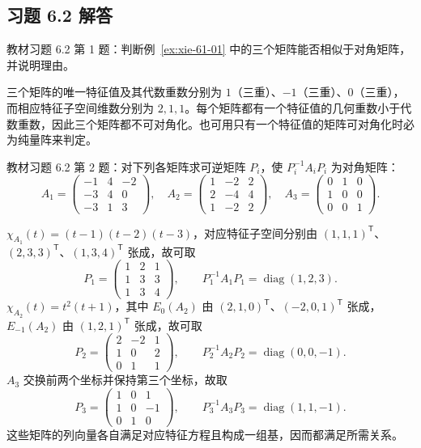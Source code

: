 \subsection{习题 6.2 解答}
\label{subsec:xie-exercises-62}

\begin{example}
\label{ex:xie-62-01}
教材习题 6.2 第 1 题：判断例~\ref{ex:xie-61-01} 中的三个矩阵能否相似于对角矩阵，并说明理由。
\end{example}
\begin{solve}
三个矩阵的唯一特征值及其代数重数分别为 $1$（三重）、$-1$（三重）、$0$（三重），而相应特征子空间维数分别为 $2,1,1$。每个矩阵都有一个特征值的几何重数小于代数重数，因此三个矩阵都不可对角化。也可用只有一个特征值的矩阵可对角化时必为纯量阵来判定。
\end{solve}

\begin{example}
\label{ex:xie-62-02}
教材习题 6.2 第 2 题：对下列各矩阵求可逆矩阵 $P_i$，使 $P_i^{-1}A_iP_i$ 为对角矩阵：
\[
 A_1=\begin{pmatrix}-1&4&-2\\-3&4&0\\-3&1&3\end{pmatrix},\quad
 A_2=\begin{pmatrix}1&-2&2\\2&-4&4\\1&-2&2\end{pmatrix},\quad
 A_3=\begin{pmatrix}0&1&0\\1&0&0\\0&0&1\end{pmatrix}.
\]
\end{example}
\begin{solve}
$\chi_{A_1}(t)=(t-1)(t-2)(t-3)$，对应特征子空间分别由 $(1,1,1)^{\mathsf T}$、$(2,3,3)^{\mathsf T}$、$(1,3,4)^{\mathsf T}$ 张成，故可取
\[
 P_1=\begin{pmatrix}1&2&1\\1&3&3\\1&3&4\end{pmatrix},
 \qquad P_1^{-1}A_1P_1=\operatorname{diag}(1,2,3).
\]
$\chi_{A_2}(t)=t^2(t+1)$，其中 $E_0(A_2)$ 由 $(2,1,0)^{\mathsf T}$、$(-2,0,1)^{\mathsf T}$ 张成，$E_{-1}(A_2)$ 由 $(1,2,1)^{\mathsf T}$ 张成，故可取
\[
 P_2=\begin{pmatrix}2&-2&1\\1&0&2\\0&1&1\end{pmatrix},
 \qquad P_2^{-1}A_2P_2=\operatorname{diag}(0,0,-1).
\]
$A_3$ 交换前两个坐标并保持第三个坐标，故取
\[
 P_3=\begin{pmatrix}1&0&1\\1&0&-1\\0&1&0\end{pmatrix},
 \qquad P_3^{-1}A_3P_3=\operatorname{diag}(1,1,-1).
\]
这些矩阵的列向量各自满足对应特征方程且构成一组基，因而都满足所需关系。
\end{solve}

